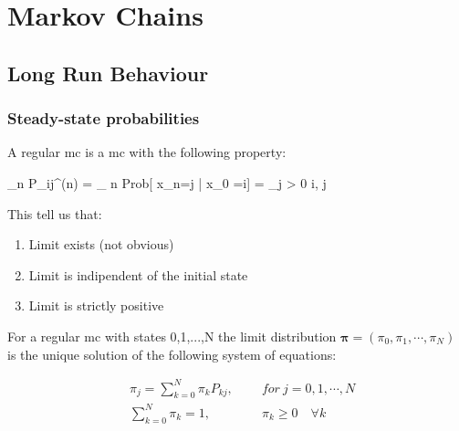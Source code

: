 \chapter{Markov Chains}

\section{Long Run Behaviour}

\subsection{Steady-state probabilities}

\begin{definition}
	A regular \gls{mc} is a \gls{mc} with the following property:

	\beq \lim_{n \to \infty} P_{ij}^{(n)} = \lim_{ n \to \infty} Prob[ x_n=j | x_0 =i] = \pi_j > 0 \quad \forall i, j \eeq
\end{definition}

This tell us that:
\begin{enumerate}
\item Limit exists (not obvious)
\item Limit is indipendent of the initial state
\item Limit is strictly positive
\end{enumerate}


\begin{theorem}
For a regular \gls{mc} with states 0,1,...,N the limit distribution $\bm\pi = (\pi_0,\pi_1,\cdots,\pi_N)$ is the unique solution of the following system of equations:

\begin{align}
	&\pi_j = \sum_{k=0}^N \pi_k P_{k j} , \qquad ~for ~j = 0,1, \cdots, N \\
	&\sum_{k=0}^N \pi_k = 1, \qquad \qquad \pi_k \ge 0 \quad \forall k
\end{align}

\end{theorem}

